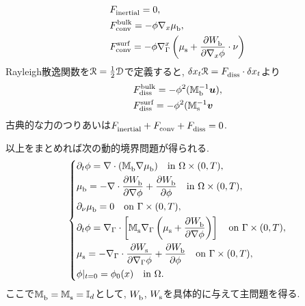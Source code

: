 \documentclass[a4paper]{article}
\begin{document}
\begin{enumerate}
\begin{align}
		&{F}^{\text{}}_{\text{inertial}} = 0,\\
		&{F}^{\text{bulk}}_{\text{conv}} = -\phi\nabla_x{\mu}^{\text{}}_{\text{b}},\\
		&{F}^{\text{surf}}_{\text{conv}} = -\phi\nabla_{\Gamma}^x\left( {\mu}^{\text{}}_{\text{s}} + \frac{\partial{W}^{\text{}}_{\text{b}}}{\partial\nabla_x\phi}\cdot\nu\right)
	\end{align}
	Rayleigh散逸関数を$\mathcal{R}=\frac{1}{2}\mathcal{D}$で定義すると, $\delta{x_t}\mathcal{R} = {F}^{\text{}}_{\text{diss}}\cdot\delta x_t$より
	\begin{align}
		&{F}^{\text{bulk}}_{\text{diss}} = -\phi^2({\mathbb{M}}^{\text{$-1$}}_{\text{b}}\bm{u}),\\
		&{F}^{\text{surf}}_{\text{diss}} = -\phi^2({\mathbb{M}}^{\text{$-1$}}_{\text{s}}\bm{v}
	\end{align}
	古典的な力のつりあいは${F}^{\text{}}_{\text{inertial}} + {F}^{\text{}}_{\text{conv}} + {F}^{\text{}}_{\text{diss}} = 0$.
\end{enumerate}

以上をまとめれば次の動的境界問題が得られる.
\begin{equation}\left\{\begin{aligned}
	&\partial_t\phi = \nabla\cdot({\mathbb{M}}^{\text{}}_{\text{b}}\nabla{\mu}^{\text{}}_{\text{b}}) \quad\text{in }\Omega\times(0,T),\\
	&{\mu}^{\text{}}_{\text{b}} = -\nabla\cdot\frac{\partial{W}^{\text{}}_{\text{b}}}{\partial\nabla\phi} + \frac{\partial{W}^{\text{}}_{\text{b}}}{\partial\phi} \quad\text{in }\Omega\times(0,T),\\
	&\partial_{\nu}{\mu}^{\text{}}_{\text{b}} = 0 \quad\text{on }\Gamma\times(0,T),\\
	&\partial_t\phi = \nabla_{\Gamma}\cdot\left[ {\mathbb{M}}^{\text{}}_{\text{s}}\nabla_{\Gamma}\left({\mu}^{\text{}}_{\text{s}} + \frac{\partial{W}^{\text{}}_{\text{b}}}{\partial\nabla\phi}\right) \right] \quad\text{on }\Gamma\times(0,T),\\
	&{\mu}^{\text{}}_{\text{s}} = -\nabla_{\Gamma}\cdot\frac{\partial{W}^{\text{}}_{\text{s}}}{\partial\nabla_{\Gamma}\phi} + \frac{\partial{W}^{\text{}}_{\text{b}}}{\partial\phi} \quad\text{on }\Gamma\times(0,T),\\
	&\phi|_{t=0} = \phi_0(x) \quad\text{in }\Omega.
\end{aligned}\right.\end{equation}
ここで${\mathbb{M}}^{\text{}}_{\text{b}}={\mathbb{M}}^{\text{}}_{\text{s}}=\mathbb{I}_d$として, ${W}^{\text{}}_{\text{b}}$, ${W}^{\text{}}_{\text{s}}$を具体的に与えて主問題を得る.
\end{document}
